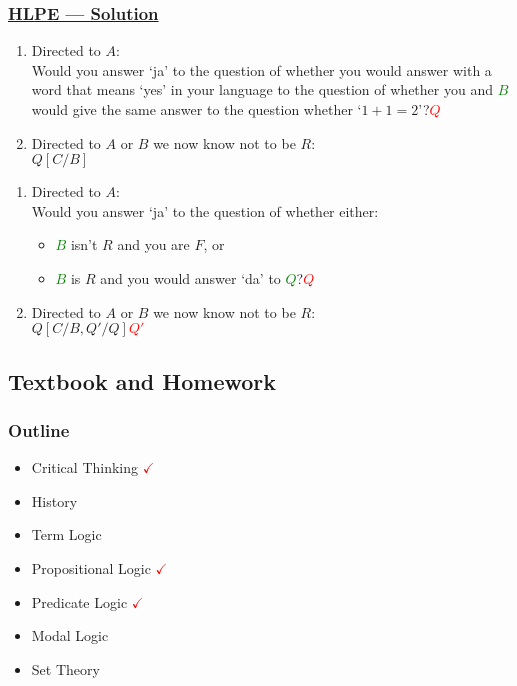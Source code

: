 \documentclass[UTF8,11pt,colorlinks,compress,openany]{beamer}%
\begin{document}
\begin{frame}\frametitle{\href{http://philsci-archive.pitt.edu/9490/1/devious.pdf}{HLPE --- Solution}}
\vspace{-3pt}
\setlength\abovedisplayskip{0pt}
\setlength\belowdisplayskip{0pt}
	\begin{solution}
		\begin{enumerate}
			\item Directed to $A$:\\
			Would you answer `ja' to the question of whether you would answer with a word that means `yes' in your language to the question of whether you and \textcolor{green}{$B$} would give the same answer to the question whether `$1+1=2$'?\hfill \textcolor{red}{$Q$}
			\item Directed to $A$ or $B$ we now know not to be $R$:\\
			$Q[C/B]$
		\end{enumerate}
	\end{solution}\vspace{-1ex}
	\begin{solution}
		\begin{enumerate}
			\item Directed to $A$:\\
			Would you answer `ja' to the question of whether either:
			\begin{itemize}
				\item \textcolor{green}{$B$} isn't $R$ and you are $F$, or
				\item \textcolor{green}{$B$} is $R$ and you would answer `da' to \textcolor{green}{$Q$}?\hfill \textcolor{red}{$Q$}
			\end{itemize}
			\item Directed to $A$ or $B$ we now know not to be $R$:\\
			$Q[C/B,Q'/Q]$\hfill \textcolor{red}{$Q'$}
		\end{enumerate}
	\end{solution}
\end{frame}

\subsection{Textbook and Homework}

\begin{frame}\frametitle{Outline}
	\begin{itemize}
		\item Critical Thinking \textcolor{red}{$\checkmark$}
		\item History
		\item Term Logic
		\item Propositional Logic \textcolor{red}{$\checkmark$}
		\item Predicate Logic \textcolor{red}{$\checkmark$}
		\item Modal Logic
		\item Set Theory
	\end{itemize}
\end{frame}
\end{document}
